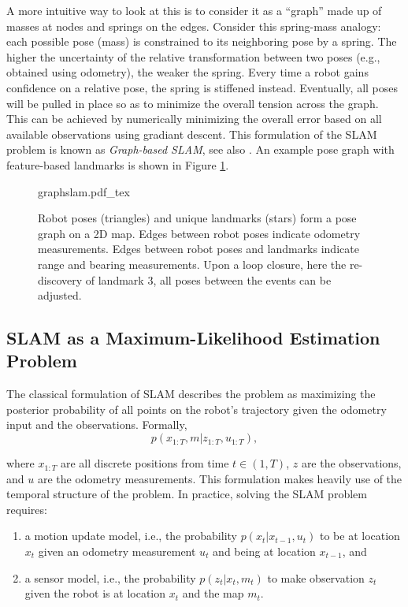 A more intuitive way to look at this is to consider it as a ``graph'' made up of masses at nodes and springs on the edges. Consider this spring-mass analogy: each possible pose (mass) is constrained to its neighboring pose by a spring. The higher the uncertainty of the relative transformation between two poses (e.g., obtained using odometry), the weaker the spring. Every time a robot gains confidence on a relative pose, the spring is stiffened instead. Eventually, all poses will be pulled in place so as to minimize the overall tension across the graph. This can be achieved by numerically minimizing the overall error based on all available observations using gradiant descent. This formulation of the SLAM problem is known as \emph{Graph-based SLAM}, see also \cite{grisetti2010tutorial}. An example pose graph with feature-based landmarks is shown in Figure \ref{fig:graphslam}.

\begin{figure}
\centering
    \def\svgwidth{0.6\textwidth}
    {graphslam.pdf_tex}
    \caption{Robot poses (triangles) and unique landmarks (stars) form a pose graph on a 2D map. Edges between robot poses indicate odometry measurements. Edges between robot poses and landmarks indicate range and bearing measurements. Upon a loop closure, here the re-discovery of landmark 3, all poses between the events can be adjusted. }\label{fig:graphslam}
\end{figure}

\subsection{SLAM as a Maximum-Likelihood Estimation Problem}
The classical formulation of SLAM describes the problem as maximizing the posterior probability of all points on the robot's trajectory given the odometry input and the observations. Formally,
\begin{equation}
p(x_{1:T},m|z_{1:T},u_{1:T}),
\end{equation}

\noindent where $ x_{1:T}$ are all discrete positions from time $t \in (1, T)$, $ z$ are the observations, and $ u$ are the odometry measurements. This formulation makes heavily use of the temporal structure of the problem. In practice, solving the SLAM problem requires:

\begin{enumerate}
\item a motion update model, i.e., the probability $ p(x_t|x_{t-1},u_t)$ to be at location $ x_t$ given an odometry measurement $ u_t$ and being at location $ x_{t-1}$, and
\item a sensor model, i.e., the probability $ p(z_t|x_t,m_t)$ to make observation $ z_t$ given the robot is at location $ x_t$ and the map $ m_t$.
\end{enumerate}

